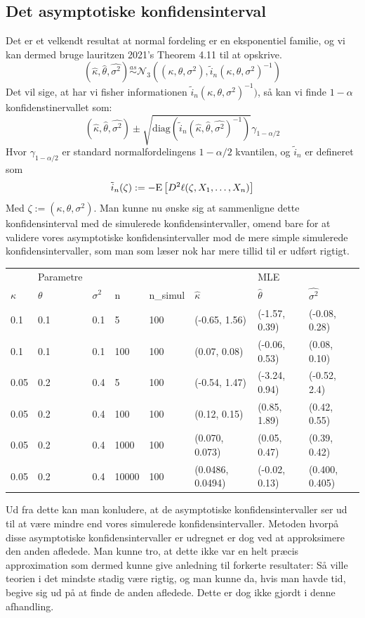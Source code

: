 \documentclass{article}
\theoremstyle{definition}
\theoremstyle{remark}
\begin{document}
\subsection{Det asymptotiske konfidensinterval}
Det er et velkendt resultat at normal fordeling er en eksponentiel familie, og vi kan dermed bruge lauritzen 2021's Theorem 4.11 \cite{Lauritzen2021} til at opskrive.
$$(\hat\kappa,\hat\theta,\hat{\sigma^2})\overset{as}{\sim}\mathcal N_3((\kappa,\theta,\sigma^2),\tilde{i}_n (\kappa,\theta,\sigma^2)^{-1})$$
Det vil sige, at har vi fisher informationen $\tilde{i}_n (\kappa,\theta,\sigma^2)^{-1})$, så kan vi finde $1-\alpha$ konfidenstinervallet som:
$$(\hat\kappa,\hat\theta,\hat{\sigma^2})\pm \sqrt{\text{diag}(\tilde{i}_n (\hat\kappa,\hat\theta,\hat{\sigma^2})^{-1})}\gamma_{1-\alpha/2}$$
Hvor $\gamma_{1-\alpha/2}$ er standard normalfordelingens $1-\alpha/2$ kvantilen, og $\tilde i_n$ er defineret som
$$\tilde{i}_n (\zeta):= -\text E\left[D^2\ell (\zeta,X_1,\hdots,X_n)\right]$$
Med $\zeta := (\kappa,\theta,\sigma^2)$. Man kunne nu ønske sig at sammenligne dette konfidensinterval med de simulerede konfidensintervaller, omend bare for at validere vores asymptotiske konfidensintervaller mod de mere simple simulerede konfidensintervaller, som man som læser nok har mere tillid til er udført rigtigt.
\begin{center}
\begin{tabular}{llllllll}
 &Parametre&& &&& MLE  \\
 $\kappa$&$\theta$&$\sigma^2$&n&n\_simul&$\hat \kappa$&$\hat\theta$&$\hat{\sigma^2}$ \\
 0.1 & 0.1 & 0.1 & 5& 100 & (-0.65, 1.56)&(-1.57, 0.39)&(-0.08, 0.28)\\
 0.1 & 0.1 & 0.1 & 100& 100 & (0.07, 0.08)&(-0.06, 0.53)&(0.08, 0.10)\\
 0.05&0.2&0.4&5&100&(-0.54, 1.47)&(-3.24, 0.94)&(-0.52, 2.4)\\
 0.05&0.2&0.4&100&100&(0.12, 0.15)&(0.85, 1.89)&(0.42, 0.55)\\
 0.05&0.2&0.4&1000&100&(0.070, 0.073)&(0.05, 0.47)&(0.39, 0.42)\\
 0.05&0.2&0.4&10000&100&(0.0486, 0.0494)&(-0.02, 0.13)&(0.400, 0.405)
\end{tabular}
\end{center}
Ud fra dette kan man konludere, at de asymptotiske konfidensintervaller ser ud til at være mindre end vores simulerede konfidensintervaller. Metoden hvorpå disse asymptotiske konfidensintervaller er udregnet er dog ved at approksimere den anden afledede. Man kunne tro, at dette ikke var en helt præcis approximation som dermed kunne give anledning til forkerte resultater: Så ville teorien i det mindste stadig være rigtig, og man kunne da, hvis man havde tid, begive sig ud på at finde de anden afledede. Dette er dog ikke gjordt i denne afhandling.
\end{document}
